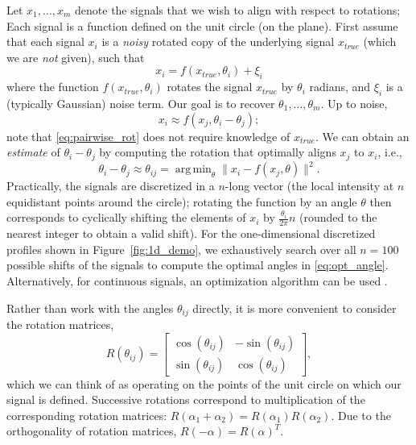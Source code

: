 \documentclass{pnastwo}
\DeclareMathOperator*{\argmin}{arg\,min}
\begin{document}
\begin{article}
\begin{materials}
Let $x_1, \dots, x_m$ denote the signals that we wish to align with respect to rotations;
%
Each signal is a function defined on the unit circle (on the plane).
%
%
First assume that each signal $x_i$ is a {\em noisy} rotated copy of the underlying signal $x_{true}$
(which we are {\em not} given), such that
\begin{equation}
x_i = f(x_{true}, \theta_i) + \xi_i
\end{equation}
where the function $f(x_{true}, \theta_i)$ rotates the signal $x_{true}$ by $\theta_i$ radians, and $\xi_i$ is a (typically Gaussian) noise term.
%
Our goal is to recover $\theta_1, \dots, \theta_m$.
%
Up to noise,
\begin{equation} \label{eq:pairwise_rot}
x_i \approx f(x_j, \theta_i - \theta_j) ;
\end{equation}
note that \eqref{eq:pairwise_rot} does not require knowledge of $x_{true}$.
%
We can obtain an {\em estimate} of $\theta_i - \theta_j$ by computing the rotation that optimally aligns $x_j$ to $x_i$,
i.e., %
%
\begin{equation} \label{eq:opt_angle}
\theta_i - \theta_j \approx \theta_{ij} = \argmin_{\theta} \|x_i - f(x_j, \theta)\|^2.
\end{equation}
%
Practically, the signals are discretized in a $n$-long vector (the local intensity at $n$ equidistant points around the circle);
rotating the function by an angle $\theta$ then corresponds to cyclically shifting the elements of $x_i$
by $\frac{\theta_i}{2 \pi} n$ (rounded to the nearest integer to obtain a valid shift).
%
For the one-dimensional discretized profiles shown in Figure~\ref{fig:1d_demo}, we exhaustively search over all $n=100$ possible shifts of the signals to compute the optimal angles in \eqref{eq:opt_angle}.
%
Alternatively, for continuous signals, an optimization algorithm
can be used \cite{ahuja2007template}.

Rather than work with the angles $\theta_{ij}$ directly, it is more convenient to consider the	 rotation matrices,
\begin{equation} \label{eq:R_theta}
R(\theta_{ij}) = \begin{bmatrix}
\cos(\theta_{ij}) & -\sin(\theta_{ij}) \\
\sin(\theta_{ij}) & \cos(\theta_{ij})
\end{bmatrix},
\end{equation}
which we can think of as operating on the points of the unit circle on which our signal is defined.
%
Successive rotations correspond to multiplication of the corresponding rotation matrices: $R(\alpha_1 + \alpha_2) = R(\alpha_1) R(\alpha_2)$.
%
Due to the orthogonality of rotation matrices, $R(-\alpha) = R(\alpha)^T$.


\end{materials}
\end{article}
\end{document}
